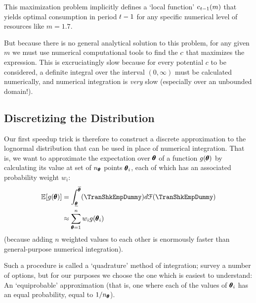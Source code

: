 \lstset{basicstyle=\ttfamily\footnotesize,breaklines=true,language=Python,frame=single}


This maximization problem implicitly defines a `local function' $\mathrm{c}_{t-1}({m})$ that yields optimal consumption in period $t-1$ for any specific numerical level of resources like ${m}=1.7$.%

But because there is no general analytical solution to this problem, for any given ${m}$ we must use numerical computational tools to find the $c$ that maximizes the expression.  This is excruciatingly slow because for every potential ${c}$ to be considered, a definite integral over the interval $(0,\infty)$ must be calculated numerically, and numerical integration is \textit{very} slow (especially over an unbounded domain!).

\hypertarget{discretizing-the-distribution}{}
\subsection{Discretizing the Distribution}
Our first speedup trick is therefore to construct a discrete approximation to the lognormal distribution that can be used in place of numerical integration.  That is, we want to approximate the expectation over $\pmb{\theta}$ of a function $g(\pmb{\theta})$ by calculating its value at set of $n_{\pmb{\theta}}$ points $\pmb{\theta}_{i}$, each of which has an associated probability weight $w_{i}$:
\begin{equation*}\begin{gathered}\begin{aligned}
      \Ex[g(\TranShkEmp)] & = \int_{\TranShkEmpMin}^{\TranShkEmpMax}(\TranShkEmpDummy)d\FDist(\TranShkEmpDummy) \\
      & \approx \sum_{\TranShkEmp = 1}^{n}w_{i}g(\TranShkEmp_{i})
    \end{aligned}\end{gathered}\end{equation*}
(because adding $n$ weighted values to each other is enormously faster than general-purpose numerical integration).

Such a procedure is called a `quadrature' method of integration; \cite{Tanaka2013-bc} survey a number of options, but for our purposes we choose the one which is easiest to understand: An `equiprobable' approximation (that is, one where each of the values of $\pmb{\theta}_{i}$ has an equal probability, equal to $1/n_{\pmb{\theta}}$).

